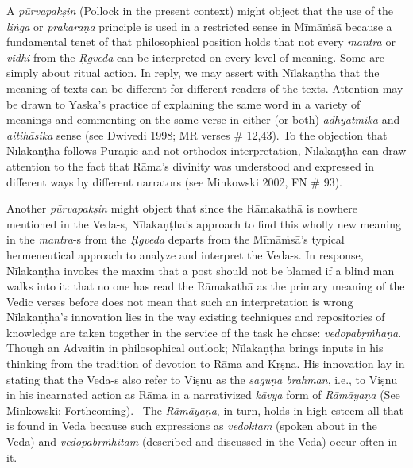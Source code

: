 \vskip 2pt

A \textit{pūrvapakṣin} (Pollock in the present context) might object that the use of the \textit{liṅga} or \textit{prakaraṇa} principle is used in a restricted sense in Mīmāṁsā because a fundamental tenet of that philosophical position holds that not every \textit{mantra} or \textit{vidhi} from the \textit{Ṛgveda} can be interpreted on every level of meaning. Some are simply about ritual action. In reply, we may assert with Nīlakaṇṭha that the meaning of texts can be different for different readers of the texts. Attention may be drawn to Yāska's practice of explaining the same word in a variety of meanings and commenting on the same verse in either (or both) \textit{adhyātmika} and \textit{aitihāsika} sense (see Dwivedi 1998; MR verses \# 12,43). To the objection that Nīlakaṇṭha follows Purāṇic and not orthodox interpretation, Nīlakaṇṭha can draw attention to the fact that Rāma's divinity was understood and expressed in different ways by different narrators (see Minkowski 2002, FN \# 93).

\vskip 2pt

Another \textit{pūrvapakṣin }might object that since the Rāmakathā is nowhere mentioned in the Veda-s, Nīlakaṇṭha’s approach to find this wholly new meaning in the \textit{mantra}-s from the \textit{Ṛgveda} departs from the Mīmāṁsā’s typical hermeneutical approach to analyze and interpret the Veda-s. In response, Nīlakaṇṭha invokes the maxim that a post should not be blamed if a blind man walks into it: that no one has read the Rāmakathā as the primary meaning of the Vedic verses before does not mean that such an interpretation is wrong Nīlakaṇṭha's innovation lies in the way existing techniques and repositories of knowledge are taken together in the service of the task he chose: \textit{vedopabṛṁhaṇa}. Though an Advaitin in philosophical outlook; Nīlakaṇṭha brings inputs in his thinking from the tradition of devotion to Rāma and Kṛṣṇa. His innovation lay in stating that the Veda-s also refer to Viṣṇu as the \textit{saguṇa brahman}, i.e., to Viṣṇu in his incarnated action as Rāma in a narrativized \textit{kāvya} form of \textit{Rāmāyaṇa} (See Minkowski: Forthcoming).  The \textit{Rāmāyaṇa}, in turn, holds in high esteem all that is found in Veda because such expressions as \textit{vedoktam} (spoken about in the Veda) and \textit{vedopabṛṁhitam} (described and discussed in the Veda) occur often in it.


